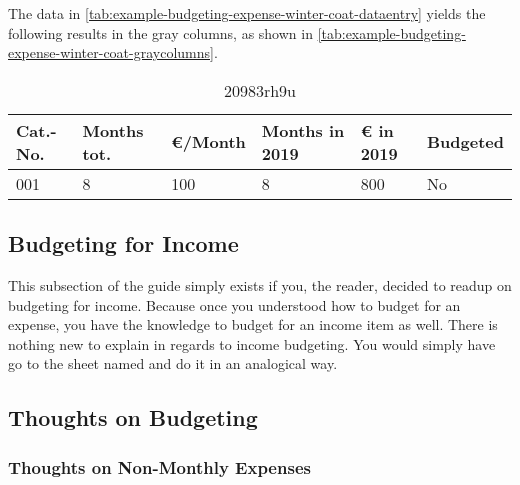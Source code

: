 The data in \autoref{tab:example-budgeting-expense-winter-coat-dataentry} yields the following results in the gray columns, as shown in \autoref{tab:example-budgeting-expense-winter-coat-graycolumns}.

\begin{table}[htbp]
\centering
\sffamily
\caption[1234234]{20983rh9u}
\label{tab:example-budgeting-expense-winter-coat-graycolumns}
\begin{tabular}{|l|l|l|l|l|l|}
	\hline
	\footnotesize\textbf{Cat.-No.} & \footnotesize\textbf{Months tot.} & \footnotesize\textbf{€/Month} & \footnotesize\textbf{Months in 2019} & \footnotesize\textbf{€ in 2019} & \footnotesize\textbf{Budgeted}\\
	\hline
	\hline
	\rowcolor{lightgray}
	001 & 8 & 100 & 8 & 800 & No\\
	\hline
\end{tabular}
\end{table}

\subsection{Budgeting for Income}
\label{subsec:budgeting-income}

This subsection of the guide simply exists if you, the reader, decided to readup on budgeting for income.
Because once you understood how to budget for an expense, you have the knowledge to budget for an income item as well.
There is nothing new to explain in regards to income budgeting.
You would simply have go to the sheet named  and do it in an analogical way.

\subsection{Thoughts on Budgeting}
\label{subsubsec:thoughts-on-budgeting}

\subsubsection{Thoughts on Non-Monthly Expenses}
\label{subsubsec:thoughts-non-monthly-expenses}

